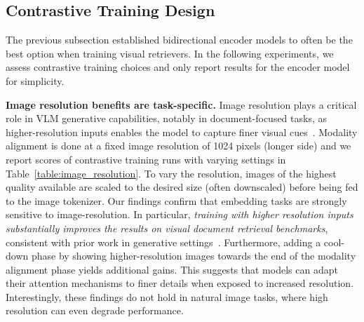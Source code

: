 \subsection{Contrastive Training Design} 

The previous subsection established bidirectional encoder models to often be the best option when training visual retrievers. In the following experiments, we assess contrastive training choices and only report results for the encoder model for simplicity.




\noindent\textbf{Image resolution benefits are task-specific.} 
Image resolution plays a critical role in VLM generative capabilities, notably in document-focused tasks, as higher-resolution inputs enables the model to capture finer visual cues~.
Modality alignment is done at a fixed image resolution of 1024 pixels (longer side) and we report scores of contrastive training runs with varying settings in Table~\ref{table:image_resolution}. To vary the resolution, images of the highest quality available are scaled to the desired size (often downscaled) before being fed to the image tokenizer. Our findings confirm that embedding tasks are strongly sensitive to image-resolution. In particular, \textit{training with higher resolution inputs substantially improves the results on visual document retrieval benchmarks}, consistent with prior work in generative settings~\cite{beyer2024paligemmaversatile3bvlm, mckinzie_mm1_2024}. Furthermore, adding a cool-down phase by showing higher-resolution images towards the end of the modality alignment phase yields additional gains. This suggests that models can adapt their attention mechanisms to finer details when exposed to increased resolution. Interestingly, these findings do not hold in natural image tasks, where high resolution can even degrade performance.


